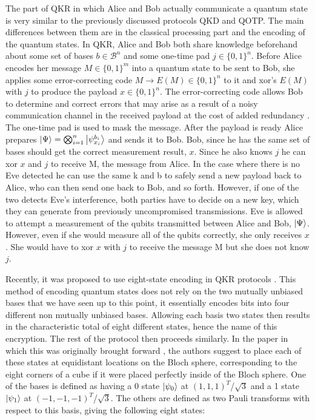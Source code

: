 \documentclass[]{article}
\begin{document}
The part of QKR in which Alice and Bob actually communicate a quantum state is very similar to the previously discussed protocols QKD and QOTP. The main differences between them are in the classical processing part and the encoding of the quantum states. In QKR, Alice and Bob both share knowledge beforehand about some set of bases $b \in \mathcal{B}^n$  and some one-time pad $j \in \{0,1\}^n$. Before Alice encodes her message $M \in \{0,1\}^m$ into a quantum state to be sent to Bob, she applies some error-correcting code $M \rightarrow E(M) \in \{0,1\}^n$ to it and xor's $E(M)$ with $j$ to produce the payload $x \in \{0,1\}^n$. The error-correcting code allows Bob to determine and correct errors that may arise as a result of a noisy communication channel in the received payload at the cost of added redundancy \cite{Knill1997}. The one-time pad is used to mask the message. After the payload is ready Alice prepares $\ket{\Psi} = \bigotimes_{i=1}^n \ket{\psi_{x_i}^{b_i}}$ and sends it to Bob. Bob, since he has the same set of bases should get the correct measurement result, $x$. Since he also knows $j$ he can xor $x$ and $j$ to receive M, the message from Alice. In the case where there is no Eve detected he can use the same k and b to safely send a new payload back to Alice, who can then send one back to Bob, and so forth. However, if one of the two detects Eve's interference, both parties have to decide on a new key, which they can generate from previously uncompromised transmissions. Eve is allowed to attempt a measurement of the qubits transmitted between Alice and Bob, $\ket{\Psi}$. However, even if she would measure all of the qubits correctly, she only receives $x$. She would have to xor $x$ with $j$ to receive the message M but she does not know $j$.

Recently, it was proposed to use eight-state encoding in QKR protocols \cite{DeVries2016}. This method of encoding quantum states does not rely on the two mutually unbiased bases that we have seen up to this point, it essentially encodes bits into four different non mutually unbiased bases. Allowing each basis two states then results in the characteristic total of eight different states, hence the name of this encryption. The rest of the protocol then proceeds similarly. In the paper in which this was originally brought forward \cite{DeVries2016}, the authors suggest to place each of these states at equidistant locations on the Bloch sphere, corresponding to the eight corners of a cube if it were placed perfectly inside of the Bloch sphere. One of the bases is defined as having a 0 state $\ket{\psi_{0}}$ at $(1,1,1)^T$/$\sqrt{3}$ and a 1 state $\ket{\psi_{1}}$ at $(-1,-1,-1)^T$/$\sqrt{3}$. The others are defined as two Pauli transforms with respect to this basis, giving the following eight states:
\end{document}
